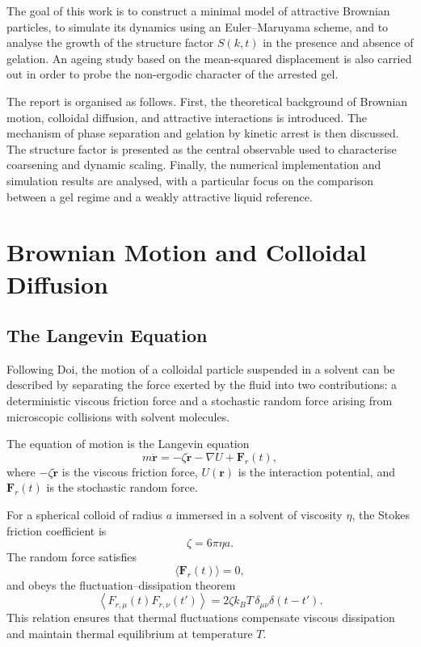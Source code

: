 \documentclass[11pt,a4paper]{article}
\begin{document}
The goal of this work is to construct a minimal model of attractive Brownian particles, to simulate its dynamics using an Euler--Maruyama scheme, and to analyse the growth of the structure factor $S(k,t)$ in the presence and absence of gelation. An ageing study based on the mean-squared displacement is also carried out in order to probe the non-ergodic character of the arrested gel.

The report is organised as follows. First, the theoretical background of Brownian motion, colloidal diffusion, and attractive interactions is introduced. The mechanism of phase separation and gelation by kinetic arrest is then discussed. The structure factor is presented as the central observable used to characterise coarsening and dynamic scaling. Finally, the numerical implementation and simulation results are analysed, with a particular focus on the comparison between a gel regime and a weakly attractive liquid reference.

\section{Brownian Motion and Colloidal Diffusion}

\subsection{The Langevin Equation}

Following Doi, the motion of a colloidal particle suspended in a solvent can be described by separating the force exerted by the fluid into two contributions: a deterministic viscous friction force and a stochastic random force arising from microscopic collisions with solvent molecules.

The equation of motion is the Langevin equation
\begin{equation}
    m\ddot{\mathbf r}
    =
    -\zeta \dot{\mathbf r}
    -\nabla U
    +
    \mathbf F_r(t),
    \label{eq:langevin}
\end{equation}
where $-\zeta \dot{\mathbf r}$ is the viscous friction force, $U(\mathbf r)$ is the interaction potential, and $\mathbf F_r(t)$ is the stochastic random force.

For a spherical colloid of radius $a$ immersed in a solvent of viscosity $\eta$, the Stokes friction coefficient is
\begin{equation}
    \zeta = 6\pi\eta a.
\end{equation}
The random force satisfies
\begin{equation}
    \langle \mathbf F_r(t)\rangle = 0,
\end{equation}
and obeys the fluctuation--dissipation theorem
\begin{equation}
    \left\langle F_{r,\mu}(t)F_{r,\nu}(t')\right\rangle
    =
    2\zeta k_B T\,\delta_{\mu\nu}\delta(t-t').
    \label{eq:fdt}
\end{equation}
This relation ensures that thermal fluctuations compensate viscous dissipation and maintain thermal equilibrium at temperature $T$.
\end{document}
